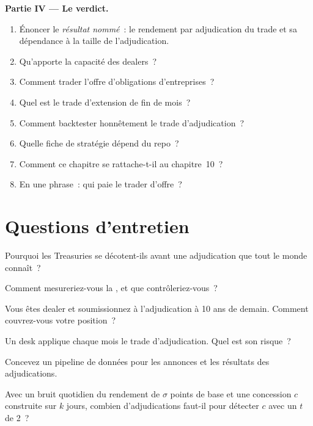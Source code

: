 \begin{problem}
\medskip\noindent\textbf{Partie IV --- Le verdict.}
\begin{enumerate}[resume]
\item Énoncer le \emph{résultat nommé}~: le rendement par adjudication du trade et sa dépendance à la taille de l'adjudication.
\item Qu'apporte la capacité des dealers~?
\item Comment trader l'offre d'obligations d'entreprises~?
\item Quel est le trade d'extension de fin de mois~?
\item Comment backtester honnêtement le trade d'adjudication~?
\item Quelle fiche de stratégie dépend du repo~?
\item Comment ce chapitre se rattache-t-il au chapitre~10~?
\item En une phrase~: qui paie le trader d'offre~?
\end{enumerate}
\end{problem}

\section{Questions d'entretien}

\begin{interviewq}\label{iq:s2:supply-trades:1}
Pourquoi les Treasuries se décotent-ils avant une adjudication que tout le monde connaît~?
\end{interviewq}

\begin{interviewq}\label{iq:s2:supply-trades:2}
Comment mesureriez-vous la , et que contrôleriez-vous~?
\end{interviewq}

\begin{interviewq}\label{iq:s2:supply-trades:3}
Vous êtes dealer et soumissionnez à l'adjudication à 10 ans de demain. Comment couvrez-vous votre position~?
\end{interviewq}

\begin{interviewq}\label{iq:s2:supply-trades:4}
Un desk applique chaque mois le trade d'adjudication. Quel est son risque~?
\end{interviewq}

\begin{interviewq}\label{iq:s2:supply-trades:5}
Concevez un pipeline de données pour les annonces et les résultats des adjudications.
\end{interviewq}

\begin{interviewq}\label{iq:s2:supply-trades:6}
Avec un bruit quotidien du rendement de $\sigma$ points de base et une concession $c$ construite sur $k$ jours, combien d'adjudications faut-il pour détecter $c$ avec un $t$ de 2~?
\end{interviewq}
